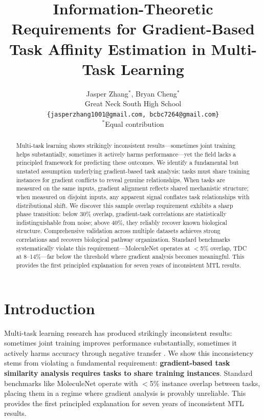 \documentclass{article}
\title{Information-Theoretic Requirements for Gradient-Based\\Task Affinity Estimation in Multi-Task Learning}
\author{Jasper Zhang$^{*}$, Bryan Cheng$^{*}$ \\
Great Neck South High School \\
\texttt{\{jasperzhang1001@gmail.com, bcbc7264@gmail.com\}} \\
$^{*}$Equal contribution
}
\begin{document}
\maketitle


\begin{abstract}
Multi-task learning shows strikingly inconsistent results---sometimes joint training helps substantially, sometimes it actively harms performance---yet the field lacks a principled framework for predicting these outcomes. We identify a fundamental but unstated assumption underlying gradient-based task analysis: tasks must share training instances for gradient conflicts to reveal genuine relationships. When tasks are measured on the same inputs, gradient alignment reflects shared mechanistic structure; when measured on disjoint inputs, any apparent signal conflates task relationships with distributional shift. We discover this sample overlap requirement exhibits a sharp phase transition: below 30\% overlap, gradient-task correlations are statistically indistinguishable from noise; above 40\%, they reliably recover known biological structure. Comprehensive validation across multiple datasets achieves strong correlations and recovers biological pathway organization. Standard benchmarks systematically violate this requirement---MoleculeNet operates at $<$5\% overlap, TDC at 8--14\%---far below the threshold where gradient analysis becomes meaningful. This provides the first principled explanation for seven years of inconsistent MTL results.
\end{abstract}

\section{Introduction}

Multi-task learning research has produced strikingly inconsistent results: sometimes joint training improves performance substantially, sometimes it actively harms accuracy through negative transfer \citep{fifty2021efficiently, wang2019negative}. We show this inconsistency stems from violating a fundamental requirement: \textbf{gradient-based task similarity analysis requires tasks to share training instances}. Standard benchmarks like MoleculeNet \citep{wu2018moleculenet} operate with $<$5\% instance overlap between tasks, placing them in a regime where gradient analysis is provably unreliable. This provides the first principled explanation for seven years of inconsistent MTL results.
\end{document}
